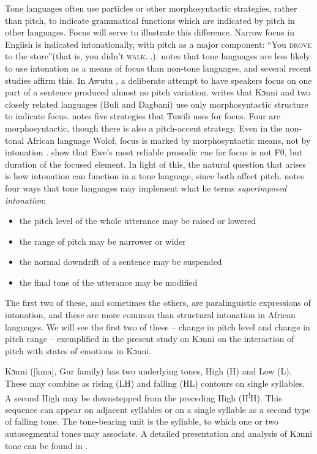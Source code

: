 \documentclass[output=paper]{langsci/langscibook}
\begin{document}
Tone languages often use particles or other morphosyntactic strategies, rather than pitch, to indicate grammatical functions which are indicated by pitch in other languages. Focus will serve to illustrate this difference. Narrow focus in English is indicated intonationally, with pitch as a major component:  ``You \textsc{drove} to the store''(that is, you didn't  \textsc{walk}...). \citet[73]{cruttenden1997} notes that tone languages are less likely to use intonation as a means of focus than non-tone languages, and several recent studies affirm this. In Awutu \citep{Lomotey2014}, a deliberate attempt to have speakers focus on one part of a sentence produced almost no pitch variation. \citet{Schwarz2009copula} writes that Kɔnni and two closely related languages (Buli and Dagbani) use only morphosyntactic structure to indicate focus. \citet{harley2009} notes five strategies that Tuwili uses for focus. Four are morphosyntactic, though there is also a pitch-accent strategy. Even in the non-tonal African language Wolof, focus is marked by morphosyntactic means, not by intonation \citep{riallandrobert2001}. \citet{fiedlerjannedy2013} show that Ewe's most reliable prosodic cue for focus is not F0, but duration of the focused element.
% 
In light of this, the natural question that arises is how intonation can function in a tone language, since both affect pitch. \citet[9--10]{cruttenden1997} notes four ways that tone languages may implement what he terms \emph{superimposed intonation}:

\begin{itemize}
\item the pitch level of the whole utterance may be raised or lowered
\item the range of pitch may be narrower or wider
\item the normal downdrift of a sentence may be suspended
\item the final tone of the utterance may be modified
\end{itemize}

The first two of these, and sometimes the others, are paralinguistic expressions of intonation, and these are more common than structural intonation in African languages. We will see the first two of these -- change in pitch level and change in pitch range -- exemplified in the present study on Kɔnni on the interaction of pitch with states of emotions in Kɔnni.

Kɔnni ([kma], Gur family) has two underlying tones, High (H) and Low (L). These may combine as rising (LH) and falling (HL) contours on single syllables. A second High may be downstepped from the preceding High (H\textsuperscript{!}H). This sequence can appear on adjacent syllables or on a single syllable as a second type of falling tone. The tone-bearing unit is the syllable, to which one or two autosegmental tones may associate. A detailed presentation and analysis of Kɔnni tone can be found in \citet{Cahill2007aspects}. 
\end{document}
